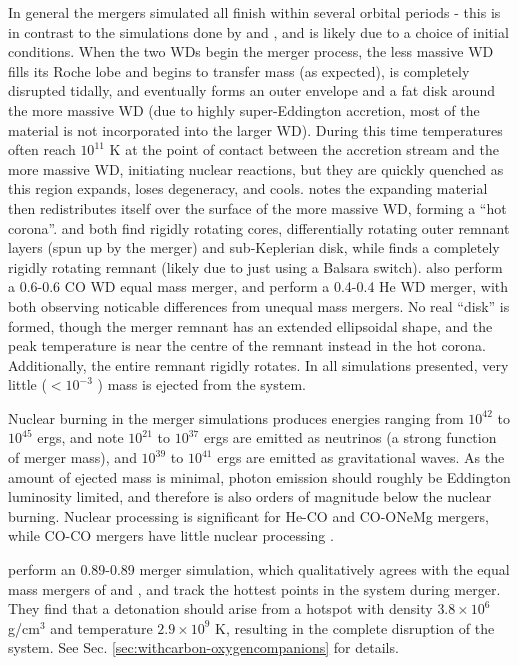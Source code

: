 In general the mergers simulated all finish within several orbital periods - this is in contrast to the simulations done by \citeauthor{motl+07} and \citeauthor{dan+11}, and is likely due to a choice of initial conditions.  When the two WDs begin the merger process, the less massive WD fills its Roche lobe and begins to transfer mass (as expected), is completely disrupted tidally, and eventually forms an outer envelope and a fat disk around the more massive WD (due to highly super-Eddington accretion, most of the material is not incorporated into the larger WD).  During this time temperatures often reach $10^{11}$ K at the point of contact between the accretion stream and the more massive WD, initiating nuclear reactions, but they are quickly quenched as this region expands, loses degeneracy, and cools.  \citeauthor{loreig09} notes the expanding material then redistributes itself over the surface of the more massive WD, forming a ``hot corona''.  \citeauthor{loreig09} and \citeauthor{yoonpr07} both find rigidly rotating cores, differentially rotating outer remnant layers (spun up by the merger) and sub-Keplerian disk, while \citeauthor{guerig04} finds a completely rigidly rotating remnant (likely due to just using a Balsara switch).  \citeauthor{loreig09} also perform a 0.6-0.6 {\Msun} CO WD equal mass merger, and \citeauthor{guerig04} perform a 0.4-0.4 {\Msun} He WD merger, with both observing noticable differences from unequal mass mergers.  No real ``disk'' is formed, though the merger remnant has an extended ellipsoidal shape, and the peak temperature is near the centre of the remnant instead in the hot corona.  Additionally, the entire remnant rigidly rotates.  In all simulations presented, very little ($< 10^{-3}$ {\Msun}) mass is ejected from the system.

Nuclear burning in the merger simulations produces energies ranging from $10^{42}$ to $10^{45}$ ergs, and \citeauthor{loreig09} note $10^{21}$ to $10^{37}$ ergs are emitted as neutrinos (a strong function of merger mass), and $10^{39}$ to $10^{41}$ ergs are emitted as gravitational waves.  As the amount of ejected mass is minimal, photon emission should roughly be Eddington luminosity limited, and therefore is also orders of magnitude below the nuclear burning.  Nuclear processing is significant for He-CO and CO-ONeMg mergers, while CO-CO mergers have little nuclear processing \citep{loreig09}.

\cite{pakm+10} perform an 0.89-0.89 merger simulation, which qualitatively agrees with the equal mass mergers of \citeauthor{loreig09} and \citeauthor{guerig04}, and track the hottest points in the system during merger.  They find that a detonation should arise from a hotspot with density $3.8 \times 10^6$ g/cm$^3$ and temperature $2.9 \times 10^9$ K, resulting in the complete disruption of the system.  See Sec. \ref{sec:withcarbon-oxygencompanions} for details.

